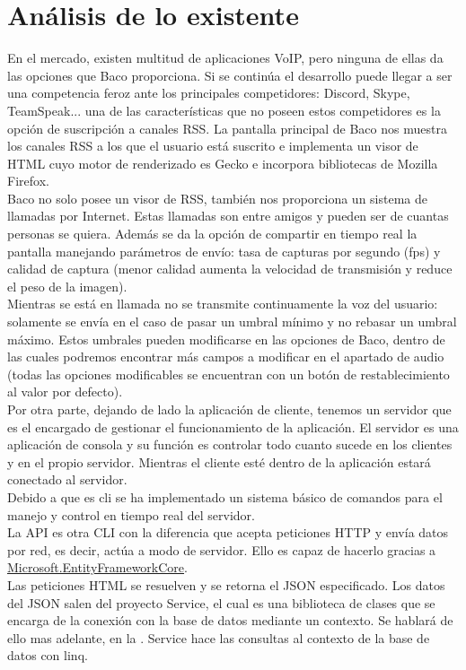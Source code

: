 \documentclass[12pt, a4paper]{book} %
\begin{document}
		\section{Análisis de lo existente}
		En el mercado, existen multitud de aplicaciones VoIP, pero ninguna de ellas da las opciones que Baco proporciona. Si se continúa el desarrollo puede llegar a ser una competencia feroz ante los principales competidores: Discord, Skype, TeamSpeak... una de las características que no poseen estos competidores es la opción de suscripción a canales RSS. La pantalla principal de Baco nos muestra los canales RSS a los que el usuario está suscrito e implementa un visor de HTML cuyo motor de renderizado es Gecko e incorpora bibliotecas de Mozilla Firefox.\\
		Baco no solo posee un visor de RSS, también nos proporciona un sistema de llamadas por Internet. Estas llamadas son entre amigos y pueden ser de cuantas personas se quiera. Además se da la opción de compartir en tiempo real la pantalla manejando parámetros de envío: tasa de capturas por segundo (\acrshort{fps}) y calidad de captura (menor calidad aumenta la velocidad de transmisión y reduce el peso de la imagen).\\
		Mientras se está en llamada no se transmite continuamente la voz del usuario: solamente se envía en el caso de pasar un umbral mínimo y no rebasar un umbral máximo. Estos umbrales pueden modificarse en las opciones de Baco, dentro de las cuales podremos encontrar más campos a modificar en el apartado de audio (todas las opciones modificables se encuentran con un botón de restablecimiento al valor por defecto).\\
		Por otra parte, dejando de lado la aplicación de cliente, tenemos un servidor que es el encargado de gestionar el funcionamiento de la aplicación. El servidor es una aplicación de consola y su función es controlar todo cuanto sucede en los clientes y en el propio servidor. Mientras el cliente esté dentro de la aplicación estará conectado al servidor.\\
		Debido a que es \acrshort{cli} se ha implementado un sistema básico de comandos para el manejo y control en tiempo real del servidor.\\
		La API es otra CLI con la diferencia que acepta peticiones HTTP y envía datos por red, es decir, actúa a modo de servidor. Ello es capaz de hacerlo gracias a \hyperlink{entity}{Microsoft.EntityFrameworkCore}.\\
		Las peticiones HTML se resuelven y se retorna el JSON especificado. Los datos del JSON salen del proyecto Service, el cual es una biblioteca de clases que se encarga de la conexión con la base de datos mediante un contexto. Se hablará de ello mas adelante, en la . Service hace las consultas al contexto de la base de datos con \acrshort{linq}.
				
\end{document}
